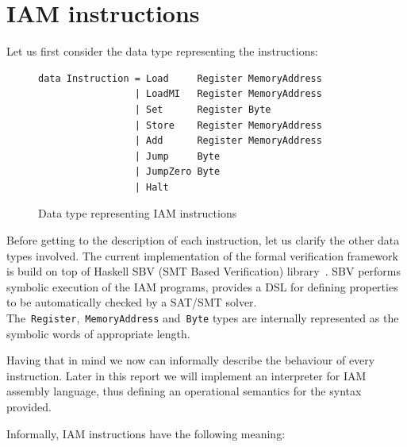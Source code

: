 \section{IAM instructions}
\label{Instructions}

Let us first consider the data type representing the instructions:

\begin{figure}[H]
\begin{verbatim}
data Instruction = Load     Register MemoryAddress
                 | LoadMI   Register MemoryAddress
                 | Set      Register Byte
                 | Store    Register MemoryAddress
                 | Add      Register MemoryAddress
                 | Jump     Byte
                 | JumpZero Byte
                 | Halt
\end{verbatim}
\caption{Data type representing IAM instructions}
\end{figure}

Before getting to the description of each instruction, let us clarify the other
data types involved. The current implementation of the formal verification
framework is build on top of Haskell SBV (SMT Based Verification)
library~\cite{SBV}. SBV performs symbolic execution of the IAM programs,
provides a DSL for defining properties to be automatically checked by a SAT/SMT solver.
The~\texttt{Register},~\texttt{MemoryAddress}
and~\texttt{Byte} types are internally represented as the symbolic
words of appropriate length.

Having that in mind we now can informally describe the behaviour of every instruction. Later in this report we will implement an interpreter for IAM assembly language, thus defining an operational semantics for the syntax provided.

Informally, IAM instructions have the following meaning:

